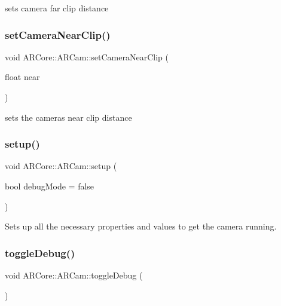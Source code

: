 sets camera far clip distance 

\mbox{\label{class_a_r_core_1_1_a_r_cam_a040d67ba6abb95e914760ca6e64ac664}} 
\subsubsection{\texorpdfstring{set\+Camera\+Near\+Clip()}{setCameraNearClip()}}
{\footnotesize\ttfamily void A\+R\+Core\+::\+A\+R\+Cam\+::set\+Camera\+Near\+Clip (\begin{DoxyParamCaption}\item[{float}]{near }\end{DoxyParamCaption})}



sets the camera\textquotesingle{}s near clip distance 

\mbox{\label{class_a_r_core_1_1_a_r_cam_a5abe4cdd0ae36986899afaeae16c6bf2}} 
\subsubsection{\texorpdfstring{setup()}{setup()}}
{\footnotesize\ttfamily void A\+R\+Core\+::\+A\+R\+Cam\+::setup (\begin{DoxyParamCaption}\item[{bool}]{debug\+Mode = {\ttfamily false} }\end{DoxyParamCaption})}



Sets up all the necessary properties and values to get the camera running. 

\mbox{\label{class_a_r_core_1_1_a_r_cam_ad32236d8551ac38943f088f16afb8002}} 
\subsubsection{\texorpdfstring{toggle\+Debug()}{toggleDebug()}}
{\footnotesize\ttfamily void A\+R\+Core\+::\+A\+R\+Cam\+::toggle\+Debug (\begin{DoxyParamCaption}{ }\end{DoxyParamCaption})}




